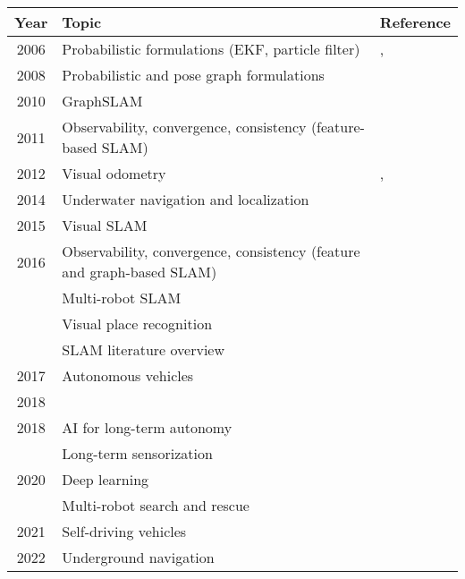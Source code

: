 \begin{table}[h]
{\begin{tabular}{c p{} p{}}
\hline
\textbf{Year} & \textbf{Topic} & \textbf{Reference}\\
\hline
2006 & Probabilistic formulations (EKF, particle filter)
     & \cite{purpose:study:durrant-whyte-bailey:2006:1}, \cite{purpose:study:durrant-whyte-bailey:2006:2}\\
\hline
2008 & Probabilistic and pose graph formulations
     & \cite{purpose:study:thrun:2008}\\
\hline
2010 & GraphSLAM
     & \cite{purpose:study:grisetti:2010}\\
\hline
2011 & Observability, convergence, consistency (feature-based SLAM)
     & \cite{purpose:study:dissanayake:2011}\\
\hline
2012 & Visual odometry
     & \cite{purpose:study:scaramuzza-fraundorfer:2011:1}, \cite{purpose:study:scaramuzza-fraundorfer:2012:2}\\
\hline
2014 & Underwater navigation and localization
     & \cite{purpose:study:paull:2014}\\
\hline
2015 & Visual SLAM
     & \cite{purpose:study:yousif:2015}\\
\hline
2016 & Observability, convergence, consistency (feature and graph-based SLAM)
     & \cite{purpose:study:huang-dissanayake:2016}\\
     & Multi-robot SLAM
     & \cite{purpose:study:saeedi:2016}\\
     & Visual place recognition
     & \cite{purpose:study:lowry:2016}\\
     & SLAM literature overview
     & \cite{purpose:study:cadena:2016}\\
\hline
2017 & Autonomous vehicles
     & \cite{purpose:study:bresson:2017}\\
\cline{1-1}
\cline{3-3}
2018 &
     & \cite{purpose:study:kuutti:2018}\\
\hline
2018 & AI for long-term autonomy
     & \cite{purpose:study:kunze:2018}\\
     & Long-term sensorization
     & \cite{purpose:study:zaffar:2018}\\
\hline
2020 & Deep learning
     & \cite{purpose:study:fayyad:2020}\\
     & Multi-robot search and rescue
     & \cite{purpose:study:queralta:2020}\\
\hline
2021 & Self-driving vehicles
     & \cite{purpose:study:badue:2021}\\
\hline
2022 & Underground navigation
     & \cite{purpose:study:ebadi}\\
\hline

  \end{tabular}}
\end{table}





